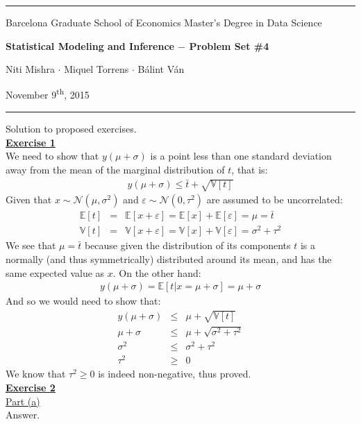 \documentclass[a4paper, 11pt]{article}
\newcommand{\header}[4]{
	\begin{center}
		\rule{\linewidth}{0.5pt}
		
		{\small{#1}}
      
        \vspace{0.2in}
        
		{\large{#2}}
		
        \vspace{0.2in}
        
		{\small{#3}}
		
		\vspace{0.15in}
		
		{#4}
		
		\vspace{-0.1in}
		\rule{\linewidth}{0.6pt}
	\end{center}
}
\begin{document}
 
\header{\sc Barcelona Graduate School of Economics \hfill Master's Degree in Data Science}{\bf Statistical Modeling and Inference $-$ Problem Set \#4}{\sc Niti Mishra $\cdot$ Miquel Torrens $\cdot$ B\'alint V\'an}{November 9\textsuperscript{th}, 2015}
Solution to proposed exercises.\\
\newline \textbf{\underline{Exercise 1}}\\
\newline We need to show that $y(\mu + \sigma)$ is a point less than one standard deviation away from the mean of the marginal distribution of $t$, that is:
\begin{eqnarray}
y(\mu + \sigma) \leq \bar{t} + \sqrt{\mathbb{V}[t]} \nonumber
\end{eqnarray}
Given that $x \sim \mathcal{N}(\mu, \sigma^2)$ and $\varepsilon \sim \mathcal{N}(0, \tau^2)$ are assumed to be uncorrelated:
\begin{eqnarray}
\mathbb{E}[t] &=& \mathbb{E}[x + \varepsilon] = \mathbb{E}[x] + \mathbb{E}[\varepsilon] = \mu = \bar{t} \nonumber \\
\mathbb{V}[t] &=& \mathbb{V}[x + \varepsilon] = \mathbb{V}[x] + \mathbb{V}[\varepsilon] = \sigma^2 + \tau^2 \nonumber
\end{eqnarray}
We see that $\mu = \bar{t}$ because given the distribution of its components $t$ is a normally (and thus symmetrically) distributed around its mean, and has the same expected value as $x$. On the other hand:
\begin{eqnarray}
y(\mu + \sigma) = \mathbb{E}[t | x = \mu + \sigma] = \mu + \sigma \nonumber
\end{eqnarray}
And so we would need to show that:
\begin{eqnarray}
y(\mu + \sigma) &\leq& \mu + \sqrt{\mathbb{V}[t]} \nonumber \\
\mu + \sigma &\leq& \mu + \sqrt{\sigma^2 + \tau^2} \nonumber \\
\sigma^2 &\leq& \sigma^2 + \tau^2  \nonumber \\
\tau^2 &\geq& 0 \nonumber
\end{eqnarray}
We know that $\tau^2 \geq 0$ is indeed non-negative, thus proved.\\
\newpage
\textbf{\underline{Exercise 2}}\\
\newline \underline{Part (a)}\\
\newline Answer.\\
\end{document}

